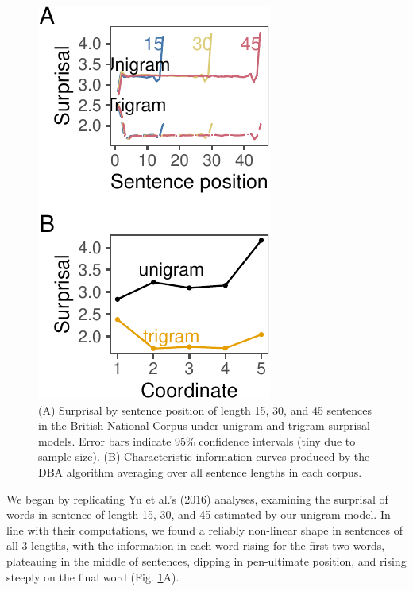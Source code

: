 \documentclass[10pt, letterpaper]{article}
\newenvironment{CodeChunk}{}{}
\begin{document}
\begin{CodeChunk}
\begin{figure}[tb]

{\centering \includegraphics{figs/bnc_plots-1} 

}

\caption[(A) Surprisal by sentence position of length 15, 30, and 45 sentences in the British National Corpus under unigram and trigram surprisal models]{(A) Surprisal by sentence position of length 15, 30, and 45 sentences in the British National Corpus under unigram and trigram surprisal models. Error bars indicate 95\% confidence intervals (tiny due to sample size). (B) Characteristic information curves produced by the DBA algorithm averaging over all sentence lengths in each corpus. }\label{fig:bnc_plots}
\end{figure}
\end{CodeChunk}

We began by replicating Yu et al.'s (2016) analyses, examining the
surprisal of words in sentence of length 15, 30, and 45 estimated by our
unigram model. In line with their computations, we found a reliably
non-linear shape in sentences of all 3 lengths, with the information in
each word rising for the first two words, plateauing in the middle of
sentences, dipping in pen-ultimate position, and rising steeply on the
final word (Fig. \ref{fig:bnc_plots}A).
\end{document}
